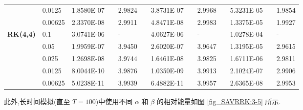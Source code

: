 \begin{table}[H]
\begin{tabular}{lllllrlrlrlrlrl}
\multicolumn{2}{l}{} & \multicolumn{2}{l}{0.0125} & 1.8580E-07 &       & 2.9824  &       & 3.8731E-07 &       & 2.9968  &       & 5.3231E-05 &       & 1.9854  \\
\multicolumn{2}{l}{} & \multicolumn{2}{l}{0.00625} & 2.3370E-08 &       & 2.9911  &       & 4.8471E-08 &       & 2.9983  &       & 1.3375E-05 &       & 1.9927  \\
\multicolumn{2}{l}{\multirow{5}[1]{*}{\textbf{RK(4,4)}}} & \multicolumn{2}{l}{0.1} & 3.0741E-06 &       & -     &       & 4.0627E-06 &       & -     &       & 1.0278E-04 &       & - \\
\multicolumn{2}{l}{} & \multicolumn{2}{l}{0.05} & 1.9959E-07 &       & 3.9450  &       & 2.6020E-07 &       & 3.9647  &       & 1.3195E-05 &       & 2.9615  \\
\multicolumn{2}{l}{} & \multicolumn{2}{l}{0.025} & 1.2698E-08 &       & 3.9744  &       & 1.6461E-08 &       & 3.9825  &       & 1.6711E-06 &       & 2.9811  \\
\multicolumn{2}{l}{} & \multicolumn{2}{l}{0.0125} & 8.0044E-10 &       & 3.9876  &       & 1.0350E-09 &       & 3.9913  &       & 2.1024E-07 &       & 2.9906  \\
\multicolumn{2}{l}{} & \multicolumn{2}{l}{0.00625} & 5.0238E-11 &       & 3.9939  &       & 6.4882E-11 &       & 3.9957  &       & 2.6365E-08 &       & 2.9953  \\
\bottomrule
\end{tabular}%
\label{tab_SAVRRK:6-4}%
\end{table}%

此外,长时间模拟(直至 $T=100$)中使用不同 $\alpha$ 和 $\beta$ 的相对能量如图 \ref{fig_SAVRRK:3-5} 所示.


